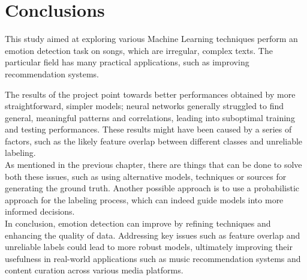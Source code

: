 \chapter*{Conclusions}
\label{ch:conclusions}
This study aimed at exploring various Machine Learning techniques perform an
emotion detection task on songs, which are irregular, complex texts.
The particular field has many practical applications, such as improving
recommendation systems.

The results of the project point towards better performances obtained by more
straightforward, simpler models; neural networks generally struggled to find
general, meaningful patterns and correlations, leading into suboptimal
training and testing performances. These results might have been caused by a
series of factors, such as the likely feature overlap between different classes and
unreliable labeling.\\

As mentioned in the previous chapter, there are things that can be done to
solve both these issues, such as using alternative models, techniques or
sources for generating the ground truth. Another possible approach
is to use a probabilistic approach for the labeling process, which
can indeed guide models into more informed decisions.\\


In conclusion, emotion detection can improve by refining techniques and enhancing the quality of data.
Addressing key issues such as feature overlap and unreliable labels
could lead to more robust models, ultimately improving their
usefulness in real-world applications such as music recommendation systems
and content curation across various media platforms.